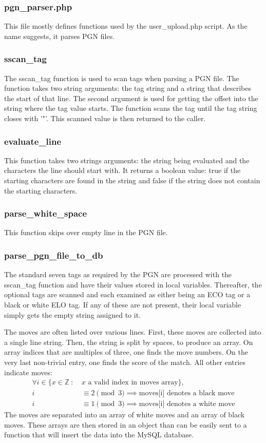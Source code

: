 \documentclass{article}
\begin{document}
\subsubsection{pgn\_parser.php}
This file mostly defines functions used by the user\_upload.php script.  As the name suggests, it parses PGN files.

\subsubsection*{sscan\_tag}
The sscan\_tag function is used to scan tags when parsing a PGN file. The function takes two string arguments:  the tag string and a string that describes the start of that line.  The second argument is used for getting the offset into the string where the tag value starts.  The function scans the tag until the tag string closes with '"'.  This scanned value is then returned to the caller.

\subsubsection*{evaluate\_line}
This function takes two strings arguments: the string being evaluated and the characters the line should start with. It returns a boolean value: true if the starting characters are found in the string and false if the string does not contain the starting characters.

\subsubsection*{parse\_white\_space}
This function skips over empty line in the PGN file.

\subsubsection*{parse\_pgn\_file\_to\_db}
The standard seven tags as required by the PGN are processed with the sscan\_tag function and have their values stored in local variables. Thereafter, the optional tags are scanned and each examined as either being an ECO tag or a black or white ELO tag.  If any of these are not present, their local variable simply gets the empty string assigned to it.

The moves are often listed over various lines.  First, these moves are collected into a single line string.  Then, the string is split by spaces, to produce an array.  On array indices that are multiples of three, one finds the move numbers.  On the very last non-trivial entry, one finds the score of the match.  All other entries indicate moves:
\begin{align*}
\forall i \in \{ x\in \mathbb{Z}\ :\ & x\text{ a valid index in moves array}\},\\
i & \equiv 2\pmod 3 \implies \text{moves[i] denotes a black move}\\
i & \equiv 1\pmod 3 \implies \text{moves[i] denotes a white move}
\end{align*}
The moves are separated into an array of white moves and an array of black moves. These arrays are then stored in an object than can be easily sent to a function that will insert the data into the MySQL database.
\end{document}
